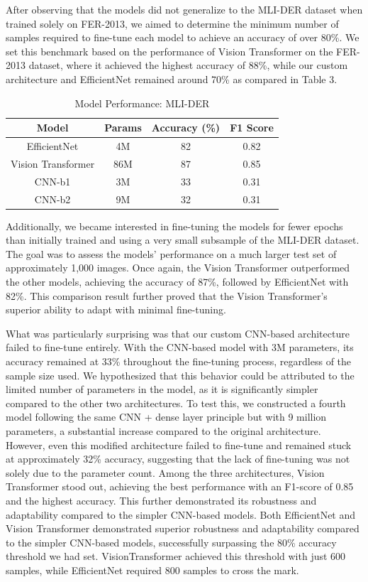 \documentclass[sigconf]{acmart}
\begin{document}
After observing that the models did not generalize to the MLI-DER dataset when trained solely on FER-2013, we aimed to determine the minimum number of samples required to fine-tune each model to achieve an accuracy of over 80\%. We set this benchmark based on the performance of Vision Transformer on the FER-2013 dataset, where it achieved the highest accuracy of 88\%, while our custom architecture and EfficientNet remained around 70\% as compared in Table 3.
\begin{table}[h]
  \caption{Model Performance: MLI-DER}
  \label{tab:mli-der-performance}
  \centering
  \begin{tabular}{|c|c|c|c|}
    \hline
    \textbf{Model} & \textbf{Params} & \textbf{Accuracy (\%)} & \textbf{F1 Score} \\
    \hline
    EfficientNet & 4M & 82 & 0.82 \\
    \hline
    Vision Transformer & 86M & 87 & 0.85 \\
    \hline
    CNN-b1 & 3M & 33 & 0.31 \\
    \hline
    CNN-b2 & 9M & 32 & 0.31 \\
    \hline
  \end{tabular}
\end{table} 

Additionally, we became interested in fine-tuning the models for fewer epochs than initially trained and using a very small subsample of the MLI-DER dataset. The goal was to assess the models' performance on a much larger test set of approximately 1,000 images. Once again, the Vision Transformer outperformed the other models, achieving the accuracy of 87\%, followed by EfficientNet with 82\%. This comparison result further proved that the Vision Transformer's superior ability to adapt with minimal fine-tuning.

What was particularly surprising was that our custom CNN-based architecture failed to fine-tune entirely. With the CNN-based model with 3M parameters, its accuracy remained at 33\% throughout the fine-tuning process, regardless of the sample size used. We hypothesized that this behavior could be attributed to the limited number of parameters in the model, as it is significantly simpler compared to the other two architectures. To test this, we constructed a fourth model following the same CNN + dense layer principle but with 9 million parameters, a substantial increase compared to the original architecture. However, even this modified architecture failed to fine-tune and remained stuck at approximately 32\% accuracy, suggesting that the lack of fine-tuning was not solely due to the parameter count. Among the three architectures, Vision Transformer stood out, achieving the best performance with an F1-score of 0.85 and the highest accuracy. This further demonstrated its robustness and adaptability compared to the simpler CNN-based models.
Both EfficientNet and Vision Transformer demonstrated superior robustness and adaptability compared to the simpler CNN-based models, successfully surpassing the 80\% accuracy threshold we had set. VisionTransformer achieved this threshold with just 600 samples, while EfficientNet required 800 samples to cross the mark. 
\end{document}
